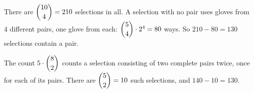There are $\dbinom{10}{4}=210$ selections in all. A selection with no pair uses gloves from $4$ different pairs, one glove from each: $\dbinom54\cdot2^4=80$ ways. So $210-80=\boxed{130}$ selections contain a pair.

The count $5\cdot\dbinom82$ counts a selection consisting of two complete pairs twice, once for each of its pairs. There are $\dbinom52=10$ such selections, and $140-10=130$.
